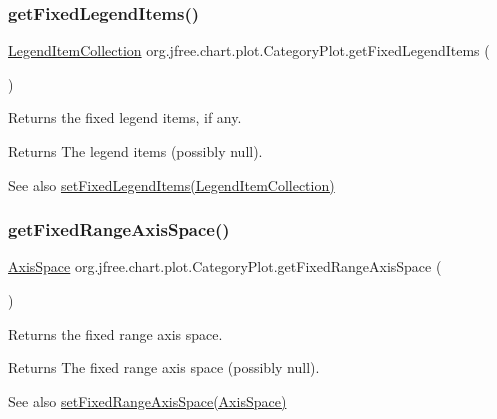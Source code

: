 \subsubsection{\texorpdfstring{get\+Fixed\+Legend\+Items()}{getFixedLegendItems()}}
{\footnotesize\ttfamily \mbox{\hyperlink{classorg_1_1jfree_1_1chart_1_1_legend_item_collection}{Legend\+Item\+Collection}} org.\+jfree.\+chart.\+plot.\+Category\+Plot.\+get\+Fixed\+Legend\+Items (\begin{DoxyParamCaption}{ }\end{DoxyParamCaption})}

Returns the fixed legend items, if any.

\begin{DoxyReturn}{Returns}
The legend items (possibly {\ttfamily null}).
\end{DoxyReturn}
\begin{DoxySeeAlso}{See also}
\mbox{\hyperlink{classorg_1_1jfree_1_1chart_1_1plot_1_1_category_plot_aa99f3c4dfdb16a776daf58d0b6043cd4}{set\+Fixed\+Legend\+Items(\+Legend\+Item\+Collection)}} 
\end{DoxySeeAlso}
\mbox{\label{classorg_1_1jfree_1_1chart_1_1plot_1_1_category_plot_a436aced34ca58adf5d445e6a62f861c9}} 
\subsubsection{\texorpdfstring{get\+Fixed\+Range\+Axis\+Space()}{getFixedRangeAxisSpace()}}
{\footnotesize\ttfamily \mbox{\hyperlink{classorg_1_1jfree_1_1chart_1_1axis_1_1_axis_space}{Axis\+Space}} org.\+jfree.\+chart.\+plot.\+Category\+Plot.\+get\+Fixed\+Range\+Axis\+Space (\begin{DoxyParamCaption}{ }\end{DoxyParamCaption})}

Returns the fixed range axis space.

\begin{DoxyReturn}{Returns}
The fixed range axis space (possibly {\ttfamily null}).
\end{DoxyReturn}
\begin{DoxySeeAlso}{See also}
\mbox{\hyperlink{classorg_1_1jfree_1_1chart_1_1plot_1_1_category_plot_a281491a8dbacd4f5a2e1cf156850d6a0}{set\+Fixed\+Range\+Axis\+Space(\+Axis\+Space)}} 
\end{DoxySeeAlso}
\mbox{\label{classorg_1_1jfree_1_1chart_1_1plot_1_1_category_plot_a3b6cd61dd0768f9226d71a083be50d17}} 
